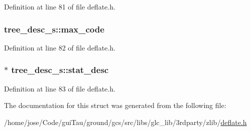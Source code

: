 Definition at line 81 of file deflate.\-h.

\hypertarget{structtree__desc__s_a11f42f2c0464693def462dcfdd871002}{
\subsubsection[{max\-\_\-code}]{ tree\-\_\-desc\-\_\-s\-::max\-\_\-code}}\label{structtree__desc__s_a11f42f2c0464693def462dcfdd871002}


Definition at line 82 of file deflate.\-h.

\hypertarget{structtree__desc__s_a7f237428776ee85058bb7f7f11900dd2}{
\subsubsection[{stat\-\_\-desc}]{$\ast$ tree\-\_\-desc\-\_\-s\-::stat\-\_\-desc}}\label{structtree__desc__s_a7f237428776ee85058bb7f7f11900dd2}


Definition at line 83 of file deflate.\-h.



The documentation for this struct was generated from the following file\-:\begin{DoxyCompactItemize}
\item 
/home/jose/\-Code/gui\-Tau/ground/gcs/src/libs/glc\-\_\-lib/3rdparty/zlib/\hyperlink{deflate_8h}{deflate.\-h}\end{DoxyCompactItemize}
